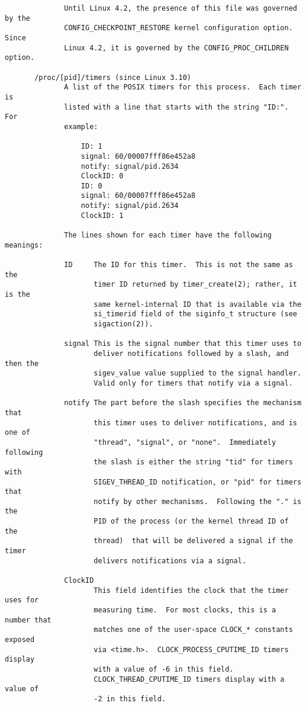 \documentclass[]{article}
\begin{document}
\begin{verbatim}
              Until Linux 4.2, the presence of this file was governed by the
              CONFIG_CHECKPOINT_RESTORE kernel configuration option.  Since
              Linux 4.2, it is governed by the CONFIG_PROC_CHILDREN option.

       /proc/[pid]/timers (since Linux 3.10)
              A list of the POSIX timers for this process.  Each timer is
              listed with a line that starts with the string "ID:".  For
              example:

                  ID: 1
                  signal: 60/00007fff86e452a8
                  notify: signal/pid.2634
                  ClockID: 0
                  ID: 0
                  signal: 60/00007fff86e452a8
                  notify: signal/pid.2634
                  ClockID: 1

              The lines shown for each timer have the following meanings:

              ID     The ID for this timer.  This is not the same as the
                     timer ID returned by timer_create(2); rather, it is the
                     same kernel-internal ID that is available via the
                     si_timerid field of the siginfo_t structure (see
                     sigaction(2)).

              signal This is the signal number that this timer uses to
                     deliver notifications followed by a slash, and then the
                     sigev_value value supplied to the signal handler.
                     Valid only for timers that notify via a signal.

              notify The part before the slash specifies the mechanism that
                     this timer uses to deliver notifications, and is one of
                     "thread", "signal", or "none".  Immediately following
                     the slash is either the string "tid" for timers with
                     SIGEV_THREAD_ID notification, or "pid" for timers that
                     notify by other mechanisms.  Following the "." is the
                     PID of the process (or the kernel thread ID of the
                     thread)  that will be delivered a signal if the timer
                     delivers notifications via a signal.

              ClockID
                     This field identifies the clock that the timer uses for
                     measuring time.  For most clocks, this is a number that
                     matches one of the user-space CLOCK_* constants exposed
                     via <time.h>.  CLOCK_PROCESS_CPUTIME_ID timers display
                     with a value of -6 in this field.
                     CLOCK_THREAD_CPUTIME_ID timers display with a value of
                     -2 in this field.


\end{verbatim}
\end{document}
